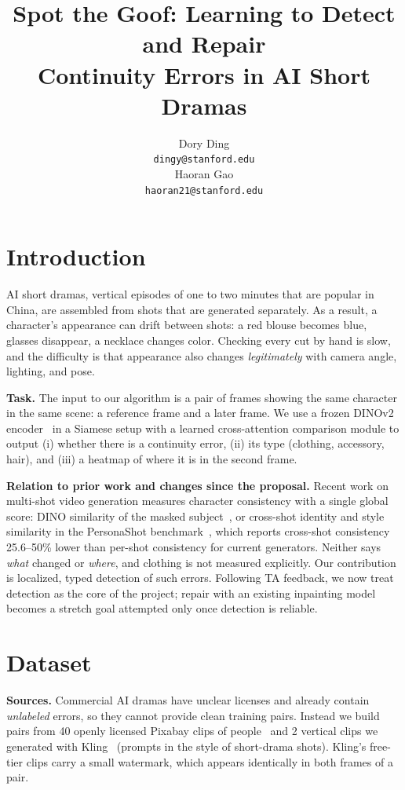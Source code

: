 \documentclass{article}
\title{Spot the Goof: Learning to Detect and Repair\\Continuity Errors in AI Short Dramas}
\author{%
  Dory Ding \\
  \texttt{dingy@stanford.edu} \\
  \And
  Haoran Gao \\
  \texttt{haoran21@stanford.edu} \\
}
\begin{document}
\maketitle

\section{Introduction}
AI short dramas, vertical episodes of one to two minutes that are popular in China, are assembled from
shots that are generated separately. As a result, a character's appearance can drift between shots:
a red blouse becomes blue, glasses disappear, a necklace changes color. Checking every cut by hand is
slow, and the difficulty is that appearance also changes \emph{legitimately} with camera angle,
lighting, and pose.

\textbf{Task.} The input to our algorithm is a pair of frames showing the same character in the same
scene: a reference frame and a later frame. We use a frozen DINOv2 encoder~\cite{oquab2023dinov2} in a
Siamese setup with a learned cross-attention comparison module to output (i) whether there is a
continuity error, (ii) its type (clothing, accessory, hair), and (iii) a heatmap of where it is in the
second frame.

\textbf{Relation to prior work and changes since the proposal.} Recent work on multi-shot video
generation measures character consistency with a single global score: DINO similarity of the masked
subject~\cite{atzmon2024motion}, or cross-shot identity and style similarity in the PersonaShot
benchmark~\cite{wang2026personashot}, which reports cross-shot consistency 25.6--50\% lower than
per-shot consistency for current generators. Neither says \emph{what} changed or \emph{where}, and
clothing is not measured explicitly. Our contribution is localized, typed detection of such errors.
Following TA feedback, we now treat detection as the core of the project; repair with an existing
inpainting model~\cite{rombach2022high} becomes a stretch goal attempted only once detection is
reliable.

\section{Dataset}
\textbf{Sources.} Commercial AI dramas have unclear licenses and already contain \emph{unlabeled}
errors, so they cannot provide clean training pairs. Instead we build pairs from
40 openly licensed Pixabay clips of people~\cite{pixabay} and 2 vertical clips we generated
with Kling~\cite{kling} (prompts in the style of short-drama shots). Kling's free-tier clips carry a
small watermark, which appears identically in both frames of a pair.
\end{document}
